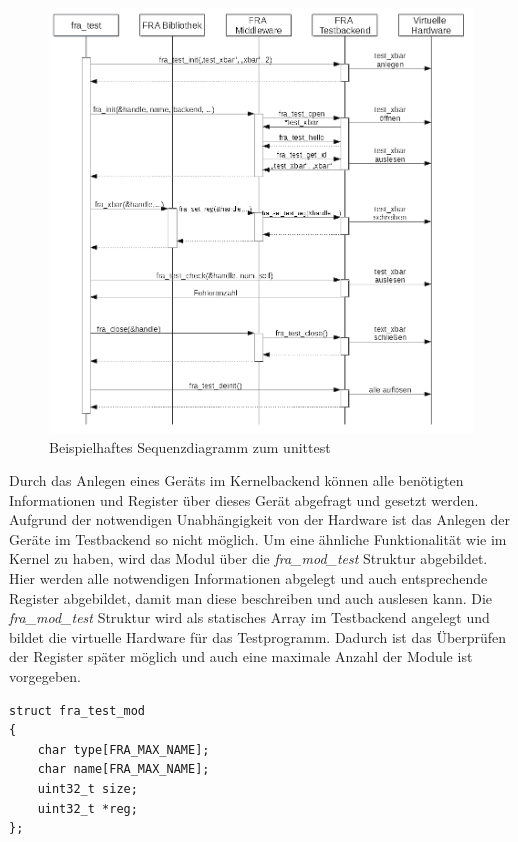 \begin{figure}[!hbtp]
	\centering
	\includegraphics[width = \linewidth]{pictures/2019-11-28-testbackend.png}
	\smallskip
	\caption{Beispielhaftes Sequenzdiagramm zum \gls{unittest}}
	\label{fig:testbackend}
\end{figure} 


Durch das Anlegen eines Geräts im Kernelbackend können alle benötigten Informationen und Register über dieses Gerät abgefragt und gesetzt werden. Aufgrund der notwendigen Unabhängigkeit von der Hardware ist das Anlegen der Geräte im Testbackend so nicht möglich. Um eine ähnliche Funktionalität wie im Kernel zu haben, wird das Modul über die \textit{fra\_mod\_test} Struktur abgebildet. Hier werden alle notwendigen Informationen abgelegt und auch entsprechende Register abgebildet, damit man diese beschreiben und auch auslesen kann.
Die \textit{fra\_mod\_test} Struktur wird als statisches Array im Testbackend angelegt und bildet die virtuelle Hardware für das Testprogramm. Dadurch ist das Überprüfen der Register später möglich und auch eine maximale Anzahl der Module ist vorgegeben. 


\begin{lstfloat}
\begin{lstlisting}
struct fra_test_mod
{
	char type[FRA_MAX_NAME];
	char name[FRA_MAX_NAME];
	uint32_t size;
	uint32_t *reg;
};
\end{lstlisting}
\end{lstfloat}


